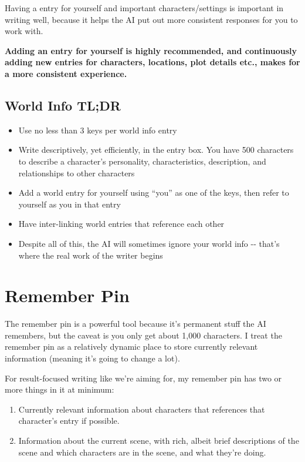 \documentclass[Avsfag-main.tex]{subfiles}
\begin{document}
Having a \wi entry for yourself and important characters/settings is important in writing well, because it helps the AI put out more consistent responses for you to work with.

\textbf{Adding an entry for yourself is highly recommended, and continuously adding new entries for characters, locations, plot details etc., makes for a more consistent experience.}

\section{World Info TL;DR}

\begin{itemize}
\item
  Use no less than 3 keys per world info entry
\item
  Write descriptively, yet efficiently, in the entry box. You have 500
  characters to describe a character's personality, characteristics,
  description, and relationships to other characters
\item
  Add a world entry for yourself using ``you'' as one of the keys, then
  refer to yourself as you in that entry
\item
  Have inter-linking world entries that reference each other
\item
  Despite all of this, the AI will sometimes ignore your world info -\/-
  that's where the real work of the writer begins
\end{itemize}

\chapter{Remember Pin}
\label{ch:rm}

\smallskip

The remember pin is a powerful tool because it's permanent stuff the AI remembers, but the caveat is you only get about 1,000 characters.
I treat the remember pin as a relatively dynamic place to store currently relevant information (meaning it's going to change a lot).

For result-focused writing like we're aiming for, my remember pin has two or more things in it at minimum:

\begin{enumerate}
\item
  Currently relevant information about characters that references that character's \wi entry if possible.
\item
  Information about the current scene, with rich, albeit brief descriptions of the scene and which characters are in the scene, and what they're doing.
\end{enumerate}
\end{document}
